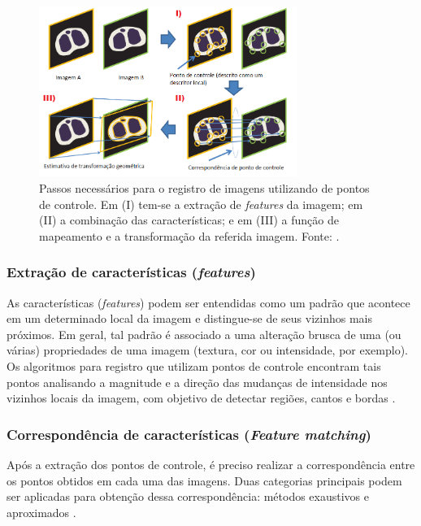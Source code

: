 \documentclass[12pt]{article}
\begin{document}
\begin{figure}[!ht]
    \centering
    \includegraphics[width=0.75\textwidth]{figures/passos_novo.png}
    \caption{Passos necessários para o registro de imagens utilizando de pontos de controle. Em (I) tem-se a extração de \textit{features} da imagem; em (II) a combinação das características; e em (III) a função de mapeamento e a transformação da referida imagem. Fonte: \cite{Uchida2013ImagePA}.}
    \label{fig:etapas_registro}
\end{figure}

\subsubsection{Extração de características (\textit{features})}

As características (\textit{features}) podem ser entendidas como um padrão que acontece em um determinado local da imagem e distingue-se de seus vizinhos mais próximos. Em geral, tal padrão é associado a uma alteração brusca de uma (ou várias) propriedades de uma imagem (textura, cor ou intensidade, por exemplo). Os algoritmos para registro que utilizam pontos de controle encontram tais pontos analisando a magnitude e a direção das mudanças de intensidade nos vizinhos locais da imagem, com objetivo de detectar regiões, cantos e bordas \cite{kazeSuporte}.

\subsubsection{Correspondência de características (\textit{Feature matching})}

Após a extração dos pontos de controle, é preciso realizar a correspondência entre os pontos obtidos em cada uma das imagens. Duas categorias principais podem ser aplicadas para obtenção dessa correspondência: métodos exaustivos e aproximados \cite{PANTANO}.
\end{document}
